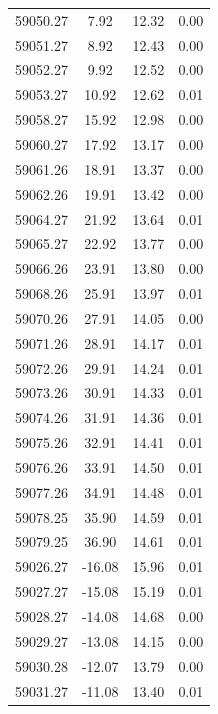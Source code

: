 \begin{longtable}{|c|c|c|c|}
 59050.27 &    7.92 &       12.32 &          0.00 \\
 59051.27 &    8.92 &       12.43 &          0.00 \\
 59052.27 &    9.92 &       12.52 &          0.00 \\
 59053.27 &   10.92 &       12.62 &          0.01 \\
 59058.27 &   15.92 &       12.98 &          0.00 \\
 59060.27 &   17.92 &       13.17 &          0.00 \\
 59061.26 &   18.91 &       13.37 &          0.00 \\
 59062.26 &   19.91 &       13.42 &          0.00 \\
 59064.27 &   21.92 &       13.64 &          0.01 \\
 59065.27 &   22.92 &       13.77 &          0.00 \\
 59066.26 &   23.91 &       13.80 &          0.00 \\
 59068.26 &   25.91 &       13.97 &          0.01 \\
 59070.26 &   27.91 &       14.05 &          0.00 \\
 59071.26 &   28.91 &       14.17 &          0.01 \\
 59072.26 &   29.91 &       14.24 &          0.01 \\
 59073.26 &   30.91 &       14.33 &          0.01 \\
 59074.26 &   31.91 &       14.36 &          0.01 \\
 59075.26 &   32.91 &       14.41 &          0.01 \\
 59076.26 &   33.91 &       14.50 &          0.01 \\
 59077.26 &   34.91 &       14.48 &          0.01 \\
 59078.25 &   35.90 &       14.59 &          0.01 \\
 59079.25 &   36.90 &       14.61 &          0.01 \\
 59026.27 &  -16.08 &       15.96 &          0.01 \\
 59027.27 &  -15.08 &       15.19 &          0.01 \\
 59028.27 &  -14.08 &       14.68 &          0.00 \\
 59029.27 &  -13.08 &       14.15 &          0.00 \\
 59030.28 &  -12.07 &       13.79 &          0.00 \\
 59031.27 &  -11.08 &       13.40 &          0.01 \\

\end{longtable}

